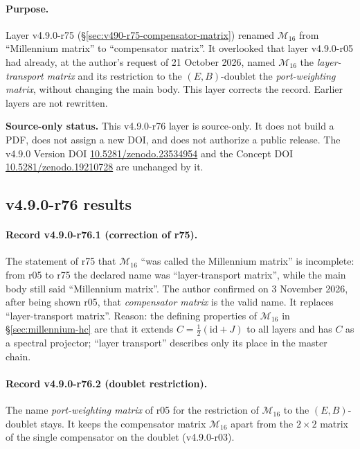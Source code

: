 \paragraph{Purpose.}
Layer v4.9.0-r75 (\S\ref{sec:v490-r75-compensator-matrix}) renamed \(\mathcal M_{16}\) from ``Millennium matrix'' to
``compensator matrix''.  It overlooked that layer v4.9.0-r05 had already, at the author's request of 21 October 2026, named
\(\mathcal M_{16}\) the \emph{layer-transport matrix} and its restriction to the \((E,B)\)-doublet the \emph{port-weighting
matrix}, without changing the main body.  This layer corrects the record.  Earlier layers are not rewritten.

\noindent\textbf{Source-only status.}
This v4.9.0-r76 layer is source-only.  It does not build a PDF, does not assign a new DOI,
and does not authorize a public release.  The v4.9.0 Version DOI
\href{https://doi.org/10.5281/zenodo.23534954}{10.5281/zenodo.23534954} and the Concept DOI
\href{https://doi.org/10.5281/zenodo.19210728}{10.5281/zenodo.19210728} are unchanged by it.

\subsection*{v4.9.0-r76 results}
\label{subsec:v490-r76-results}

\paragraph{Record v4.9.0-r76.1 (correction of r75).}
The statement of r75 that \(\mathcal M_{16}\) ``was called the Millennium matrix'' is incomplete: from r05 to r75 the
declared name was ``layer-transport matrix'', while the main body still said ``Millennium matrix''.  The author confirmed on
3 November 2026, after being shown r05, that \emph{compensator matrix} is the valid name.  It replaces ``layer-transport
matrix''.  Reason: the defining properties of \(\mathcal M_{16}\) in \S\ref{sec:millennium-hc} are that it extends
\(C=\tfrac12(\mathrm{id}+J)\) to all layers and has \(C\) as a spectral projector; ``layer transport'' describes only its place
in the master chain.

\paragraph{Record v4.9.0-r76.2 (doublet restriction).}
The name \emph{port-weighting matrix} of r05 for the restriction of \(\mathcal M_{16}\) to the \((E,B)\)-doublet stays.  It
keeps the compensator matrix \(\mathcal M_{16}\) apart from the \(2\times2\) matrix of the single compensator on the doublet
(v4.9.0-r03).

